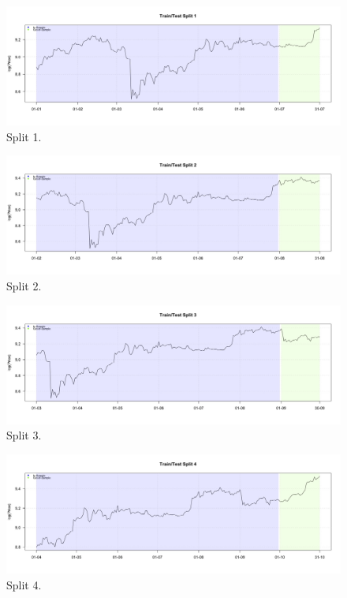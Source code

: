 \documentclass[
]{article}
\begin{document}
\begin{figure}

{\centering \includegraphics[width=0.9\linewidth]{images/splitplots/price1} 

}

\caption{Split 1.}\label{fig:price1}
\end{figure}

\begin{figure}

{\centering \includegraphics[width=0.9\linewidth]{images/splitplots/price2} 

}

\caption{Split 2.}\label{fig:price2}
\end{figure}

\begin{figure}

{\centering \includegraphics[width=0.9\linewidth]{images/splitplots/price3} 

}

\caption{Split 3.}\label{fig:price3}
\end{figure}

\begin{figure}

{\centering \includegraphics[width=0.9\linewidth]{images/splitplots/price4} 

}

\caption{Split 4.}\label{fig:price4}
\end{figure}
\end{document}
